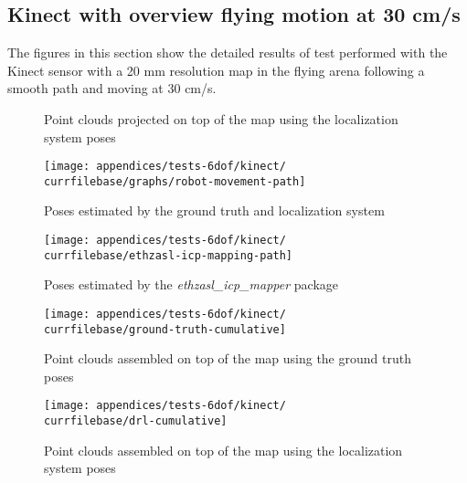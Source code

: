 \subsection{Kinect with overview flying motion at 30 cm/s}

The figures in this section show the detailed results of test performed with the Kinect sensor with a 20 mm resolution map in the flying arena following a smooth path and moving at 30 cm/s.


\begin{figure}[H]
	\centering
	\caption{Point clouds projected on top of the map using the localization system poses}
\end{figure}

\begin{figure}[H]
	\centering
	\begin{minipage}[h]{0.497\textwidth}
		\centering
		\texttt{[image: appendices/tests-6dof/kinect/\\currfilebase/graphs/robot-movement-path]}
		\caption{Poses estimated by the ground truth and localization system}
		\label{fig:localization-system-evaluation_kinect_translation_path}
	\end{minipage}\hfill
	\begin{minipage}[h]{0.497\textwidth}
		\centering
		\texttt{[image: appendices/tests-6dof/kinect/\\currfilebase/ethzasl-icp-mapping-path]}
		\caption{Poses estimated by the \emph{ethzasl\_icp\_mapper} package \cite{Pomerleau2011}}
		\label{fig:localization-system-evaluation_kinect_translation_path2}
	\end{minipage}
\end{figure}


\begin{figure}[H]
	\centering
	\texttt{[image: appendices/tests-6dof/kinect/\\currfilebase/ground-truth-cumulative]}
	\caption{Point clouds assembled on top of the map using the ground truth poses}
\end{figure}

\begin{figure}[H]
	\centering
	\texttt{[image: appendices/tests-6dof/kinect/\\currfilebase/drl-cumulative]}
	\caption{Point clouds assembled on top of the map using the localization system poses}
\end{figure}


